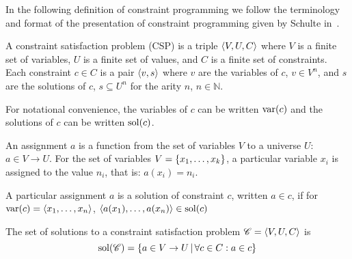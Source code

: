 
In the following definition of constraint programming we follow
the terminology and format of the presentation of 
constraint programming given by Schulte in~\cite{lecturenotes}.

A constraint satisfaction problem (CSP) is a triple $\left\langle V,U,C\right\rangle$ where $V$ is a finite set of variables, $U$ is a finite set of values, and $C$ is a finite set of constraints. Each constraint $c \in C$ is a pair $\left\langle v,s\right\rangle$ where $v$ are the variables of $c$, $v \in V^n$, and $s$ are the solutions of $c$, $s \subseteq U^n$ for the arity $n$, $n \in \mathbb{N}$.

For notational convenience, the variables of $c$ can be written $\operatorname{var}(c)$
and
the solutions of $c$ can be written $\operatorname{sol}(c)$.

An assignment $a$ is a function from the set of variables $V$ to a universe $U$: $a \in V \rightarrow U$. 
For the set of variables $V = \left\{x_1,\ldots,x_k\right\}$, a particular variable $x_i$ is assigned to the value $n_i$, that is: $a(x_i) = n_i$. 

A particular assignment $a$ is a solution of constraint $c$, written $a \in c$, if for $\operatorname{var}(c) = \left\langle x_1,\ldots,x_n\right\rangle$, $\left\langle a(x_1),\ldots,a(x_n)\right\rangle \in \operatorname{sol}(c)$

The set of solutions to a constraint satisfaction problem $\mathscr{C} = \left\langle V,U,C\right\rangle$ is 
\[\operatorname{sol}(\mathscr{C}) = \left\{a \in V \rightarrow U \,\middle|\, \forall c \in C : a \in c \right\}\]

